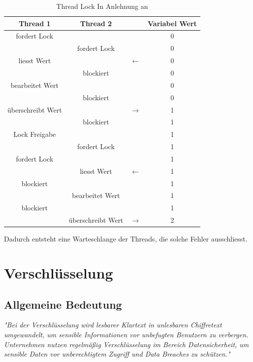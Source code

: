\begin{table}[H]
    \centering
    \begin{tabular}{|c|c|c|c|}\hline
         Thread 1&  Thread 2&  & Variabel Wert\\\hline
         fordert Lock&  &  & 0\\\hline
         &  fordert Lock&  & 0\\\hline
         liesst Wert&  & \(\longleftarrow\) & 0\\\hline
         &  blockiert&  & 0\\\hline
         bearbeitet Wert&  &  & 0\\\hline
         &  blockiert&  & 0\\\hline
         überschreibt Wert&  &  \(\longrightarrow\)& 1\\ \hline
 & blockiert& &1\\\hline
 Lock Freigabe& & &1\\\hline
 & fordert Lock& &1\\\hline
 fordert Lock& & &1\\\hline
 & liesst Wert& \(\longleftarrow\)&1\\\hline
 blockiert& & &1\\\hline
 & bearbeitet Wert& &1\\\hline
 blockiert& & &1\\\hline
 & überschreibt Wert& \(\longrightarrow\)&2\\\hline
    \end{tabular}
    \caption{Thread Lock In Anlehnung an \cite{RaceCondition2026}}
    \label{tab:G2}
\end{table}

Dadurch entsteht eine Warteschlange der Threads, die solche Fehler ausschliesst.

\section{Verschlüsselung}

\subsection{Allgemeine Bedeutung}

\textit{"Bei der Verschlüsselung wird lesbarer Klartext in unlesbaren Chiffretext umgewandelt, um sensible Informationen vor unbefugten Benutzern zu verbergen. Unternehmen nutzen regelmäßig Verschlüsselung im Bereich Datensicherheit, um sensible Daten vor unberechtigtem Zugriff und Data Breaches zu schützen."}\citep{WasVerstehtMan2025}\\

